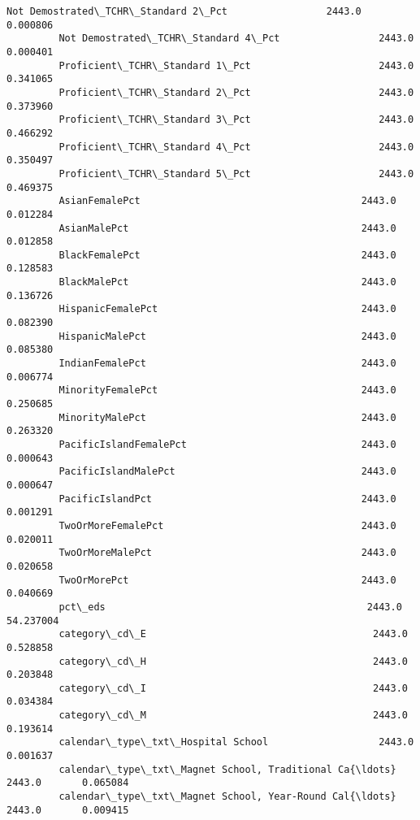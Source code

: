 \documentclass[11pt]{article}
\begin{document}
\begin{Verbatim}[commandchars=\\\{\}]
         Not Demostrated\_TCHR\_Standard 2\_Pct                 2443.0       0.000806   
         Not Demostrated\_TCHR\_Standard 4\_Pct                 2443.0       0.000401   
         Proficient\_TCHR\_Standard 1\_Pct                      2443.0       0.341065   
         Proficient\_TCHR\_Standard 2\_Pct                      2443.0       0.373960   
         Proficient\_TCHR\_Standard 3\_Pct                      2443.0       0.466292   
         Proficient\_TCHR\_Standard 4\_Pct                      2443.0       0.350497   
         Proficient\_TCHR\_Standard 5\_Pct                      2443.0       0.469375   
         AsianFemalePct                                      2443.0       0.012284   
         AsianMalePct                                        2443.0       0.012858   
         BlackFemalePct                                      2443.0       0.128583   
         BlackMalePct                                        2443.0       0.136726   
         HispanicFemalePct                                   2443.0       0.082390   
         HispanicMalePct                                     2443.0       0.085380   
         IndianFemalePct                                     2443.0       0.006774   
         MinorityFemalePct                                   2443.0       0.250685   
         MinorityMalePct                                     2443.0       0.263320   
         PacificIslandFemalePct                              2443.0       0.000643   
         PacificIslandMalePct                                2443.0       0.000647   
         PacificIslandPct                                    2443.0       0.001291   
         TwoOrMoreFemalePct                                  2443.0       0.020011   
         TwoOrMoreMalePct                                    2443.0       0.020658   
         TwoOrMorePct                                        2443.0       0.040669   
         pct\_eds                                             2443.0      54.237004   
         category\_cd\_E                                       2443.0       0.528858   
         category\_cd\_H                                       2443.0       0.203848   
         category\_cd\_I                                       2443.0       0.034384   
         category\_cd\_M                                       2443.0       0.193614   
         calendar\_type\_txt\_Hospital School                   2443.0       0.001637   
         calendar\_type\_txt\_Magnet School, Traditional Ca{\ldots}  2443.0       0.065084   
         calendar\_type\_txt\_Magnet School, Year-Round Cal{\ldots}  2443.0       0.009415   

\end{Verbatim}
\end{document}

